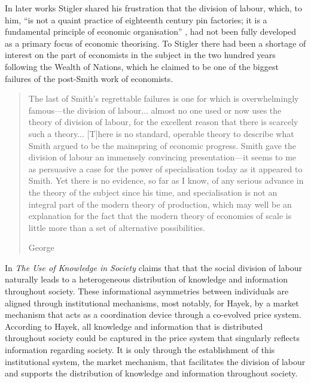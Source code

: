 In later works Stigler shared his frustration that the division of labour, which, to him, ``is not a quaint practice of eighteenth century pin factories; it is a fundamental principle of economic organisation'' \citep[p.~135]{Stigler1951}, had not been fully developed as a primary focus of economic theorising. To Stigler there had been a shortage of interest on the part of economists in the subject in the two hundred years following the Wealth of Nations, which he claimed to be one of the biggest failures of the post-Smith work of economists.

\begin{quote}
The last of Smith's regrettable failures is one for which is overwhelmingly famous---the division of labour... almost no one used or now uses the theory of division of labour, for the excellent reason that there is scarcely such a theory... [T]here is no standard, operable theory to describe what Smith argued to be the mainspring of economic progress. Smith gave the division of labour an immensely convincing presentation---it seems to me as persuasive a case for the power of specialisation today as it appeared to Smith. Yet there is no evidence, so far as I know, of any serious advance in the theory of the subject since his time, and specialisation is not an integral part of the modern theory of production, which may well be an explanation for the fact that the modern theory of economies of scale is little more than a set of alternative possibilities.

\begin{flushright}
George \citet[p.~1209--1210]{Stigler1976}
\end{flushright}
\end{quote}

In \emph{The Use of Knowledge in Society} \citet{Hayek1945} claims that that the social division of labour naturally leads to a heterogeneous distribution of knowledge and information throughout society. These informational asymmetries between individuals are aligned through institutional mechanisms, most notably, for Hayek, by a market mechanism that acts as a coordination device through a co-evolved price system. According to Hayek, all knowledge and information that is distributed throughout society could be captured in the price system that singularly reflects information regarding society. It is only through the establishment of this institutional system, the market mechanism, that facilitates the division of labour and supports the distribution of knowledge and information throughout society.

